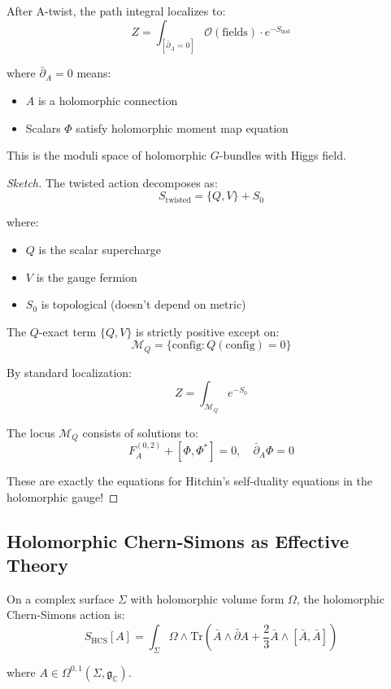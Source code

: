 \begin{theorem}
After A-twist, the path integral localizes to:
$$Z = \int_{[\bar{\partial}_A = 0]} \mathcal{O}(\text{fields}) \cdot e^{-S_{\text{inst}}}$$

where $\bar{\partial}_A = 0$ means:
\begin{itemize}
\item $A$ is a holomorphic connection
\item Scalars $\Phi$ satisfy holomorphic moment map equation
\end{itemize}

This is the moduli space of holomorphic $G$-bundles with Higgs field.
\end{theorem}

\begin{proof}[Sketch]
The twisted action decomposes as:
$$S_{\text{twisted}} = \{Q, V\} + S_0$$

where:
\begin{itemize}
\item $Q$ is the scalar supercharge
\item $V$ is the gauge fermion
\item $S_0$ is topological (doesn't depend on metric)
\end{itemize}

The $Q$-exact term $\{Q, V\}$ is strictly positive except on:
$$\mathcal{M}_Q = \{\text{config} : Q(\text{config}) = 0\}$$

By standard localization:
$$Z = \int_{\mathcal{M}_Q} e^{-S_0}$$

The locus $\mathcal{M}_Q$ consists of solutions to:
$$F_{A}^{(0,2)} + [\Phi, \Phi^*] = 0, \quad \bar{\partial}_A \Phi = 0$$

These are exactly the equations for Hitchin's self-duality equations in the 
holomorphic gauge!
\end{proof}

\subsection{Holomorphic Chern-Simons as Effective Theory}

\begin{definition}
On a complex surface $\Sigma$ with holomorphic volume form $\Omega$, the 
holomorphic Chern-Simons action is:
$$S_{\text{HCS}}[A] = \int_{\Sigma} \Omega \wedge \text{Tr}\left(\bar{A} 
\wedge \bar{\partial} A + \frac{2}{3} \bar{A} \wedge [\bar{A}, \bar{A}]\right)$$

where $A \in \Omega^{0,1}(\Sigma, \mathfrak{g}_{\mathbb{C}})$.
\end{definition}

